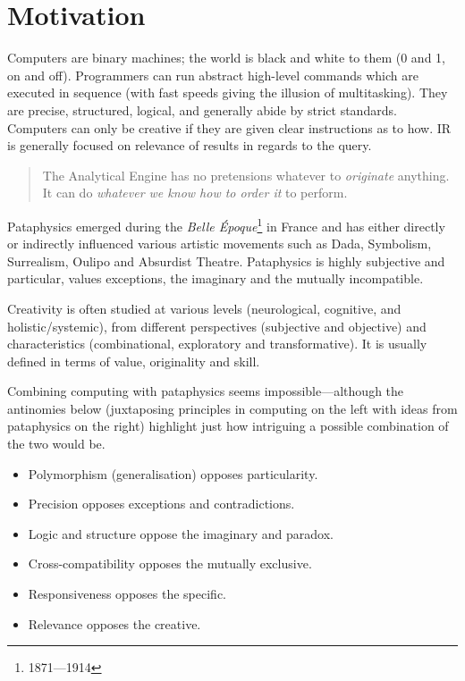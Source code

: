 \section{Motivation}

Computers are binary machines; the world is black and white to them (0 and 1, on and off). Programmers can run abstract high-level commands which are executed in sequence (with fast speeds giving the illusion of multitasking). They are precise, structured, logical, and generally abide by strict standards. Computers can only be creative if they are given clear instructions as to how. \acl{IR} is generally focused on relevance of results in regards to the query.

\begin{quotation}
  The Analytical Engine has no pretensions whatever to \emph{originate} anything. It can do \emph{whatever we know how to order it} to perform. 
\end{quotation}

Pataphysics emerged during the \textit{Belle Époque}\footnote{1871---1914} in France and has either directly or indirectly influenced various artistic movements such as Dada, Symbolism, Surrealism, Oulipo and Absurdist Theatre. Pataphysics is highly subjective and particular, values exceptions, the imaginary and the mutually incompatible.

Creativity is often studied at various levels (neurological, cognitive, and holistic/systemic), from different perspectives (subjective and objective) and characteristics (combinational, exploratory and transformative). It is usually defined in terms of value, originality and skill.

Combining computing with pataphysics seems impossible---although the antinomies below (juxtaposing principles in computing on the left with ideas from pataphysics on the right) highlight just how intriguing a possible combination of the two would be.

\begin{itemize}
  \item Polymorphism (generalisation) opposes particularity.
  \item Precision opposes exceptions and contradictions.
  \item Logic and structure oppose the imaginary and paradox.
  \item Cross-compatibility opposes the mutually exclusive.
  \item Responsiveness opposes the specific.
  \item Relevance opposes the creative.
\end{itemize}

